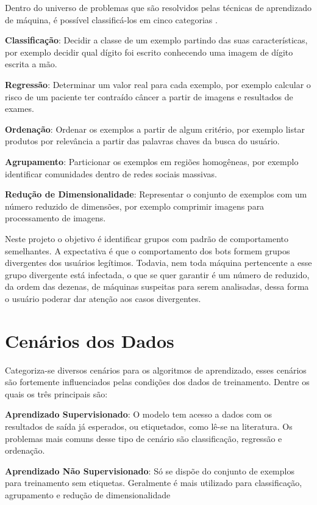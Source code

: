 Dentro do universo de problemas que são resolvidos pelas técnicas de aprendizado de máquina, é possível classificá-los em cinco categorias \citep{mohri2012foundations}.

\begin{description}
\item \textbf{Classificação}: Decidir a classe de um exemplo partindo das suas características, por exemplo decidir qual dígito foi escrito conhecendo uma imagem de dígito escrita a mão.
\item \textbf{Regressão}: Determinar um valor real para cada exemplo, por exemplo calcular o risco de um paciente ter contraído câncer a partir de imagens e resultados de exames.
\item \textbf{Ordenação}: Ordenar os exemplos a partir de algum critério, por exemplo listar produtos por relevância a partir das palavras chaves da busca do usuário.
\item \textbf{Agrupamento}: Particionar os exemplos em regiões homogêneas, por exemplo identificar comunidades dentro de redes sociais massivas.
\item \textbf{Redução de Dimensionalidade}: Representar o conjunto de exemplos com um número reduzido de dimensões, por exemplo comprimir imagens para processamento de imagens.
\end{description}

Neste projeto o objetivo é identificar grupos com padrão de comportamento semelhantes. A expectativa é que o comportamento dos bots formem grupos divergentes dos usuários legítimos. Todavia, nem toda máquina pertencente a esse grupo divergente está infectada, o que se quer garantir é um número de reduzido, da ordem das dezenas, de máquinas suspeitas para serem analisadas, dessa forma o usuário poderar dar atenção aos casos divergentes.

\section{Cenários dos Dados}

Categoriza-se \citep{mohri2012foundations} diversos cenários para os algoritmos de aprendizado, esses cenários são fortemente influenciados pelas condições dos dados de treinamento. Dentre os quais os três principais são:

\begin{description}
\item \textbf{Aprendizado Supervisionado}: O modelo tem acesso a dados com os resultados de saída já esperados, ou etiquetados, como lê-se na literatura. Os problemas mais comuns desse tipo de cenário são classificação, regressão e ordenação.

\item \textbf{Aprendizado Não Supervisionado}: Só se dispõe do conjunto de exemplos para treinamento sem etiquetas. Geralmente é mais utilizado para classificação, agrupamento e redução de dimensionalidade

\end{description}

